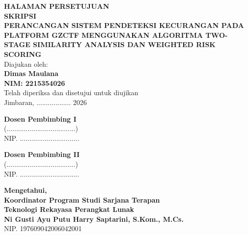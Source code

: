 \begin{titlepage}
\begin{center}
\vspace*{1cm}

\textbf{\large HALAMAN PERSETUJUAN}\\[0.6cm]
\textbf{\large SKRIPSI}\\[0.6cm]
\textbf{\Large PERANCANGAN SISTEM PENDETEKSI KECURANGAN PADA PLATFORM GZCTF MENGGUNAKAN ALGORITMA TWO-STAGE SIMILARITY ANALYSIS DAN WEIGHTED RISK SCORING}\\[0.8cm]

Diajukan oleh:\\[0.2cm]
\textbf{Dimas Maulana}\\
\textbf{NIM: 2215354026}\\[0.8cm]

Telah diperiksa dan disetujui untuk diujikan\\[0.2cm]
Jimbaran, .................. 2026

\vspace{1cm}

\begin{minipage}[t]{0.45\textwidth}
\centering
\textbf{Dosen Pembimbing I}\\[1.5cm]
(....................................)\\
NIP. ...............................
\end{minipage}
\hfill
\begin{minipage}[t]{0.45\textwidth}
\centering
\textbf{Dosen Pembimbing II}\\[1.5cm]
(....................................)\\
NIP. ...............................
\end{minipage}

\vspace{1cm}

\textbf{Mengetahui,}\\
\textbf{Koordinator Program Studi Sarjana Terapan}\\
\textbf{Teknologi Rekayasa Perangkat Lunak}\\[1.5cm]
\textbf{Ni Gusti Ayu Putu Harry Saptarini, S.Kom., M.Cs.}\\
NIP. 197609042006042001

\end{center}
\end{titlepage}
